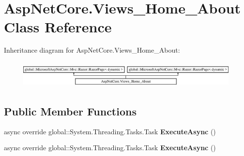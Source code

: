 \hypertarget{class_asp_net_core_1_1_views___home___about}{}\section{Asp\+Net\+Core.\+Views\+\_\+\+Home\+\_\+\+About Class Reference}
\label{class_asp_net_core_1_1_views___home___about}
Inheritance diagram for Asp\+Net\+Core.\+Views\+\_\+\+Home\+\_\+\+About\+:\begin{figure}[H]
\begin{center}
\leavevmode
\includegraphics[height=1.432225cm]{class_asp_net_core_1_1_views___home___about}
\end{center}
\end{figure}
\subsection*{Public Member Functions}
\begin{DoxyCompactItemize}
\item 
\mbox{\label{class_asp_net_core_1_1_views___home___about_a75acd1e715143d403aa42e88cb66d0fd}} 
async override global\+::\+System.\+Threading.\+Tasks.\+Task {\bfseries Execute\+Async} ()
\item 
\mbox{\label{class_asp_net_core_1_1_views___home___about_a75acd1e715143d403aa42e88cb66d0fd}} 
async override global\+::\+System.\+Threading.\+Tasks.\+Task {\bfseries Execute\+Async} ()
\end{DoxyCompactItemize}
